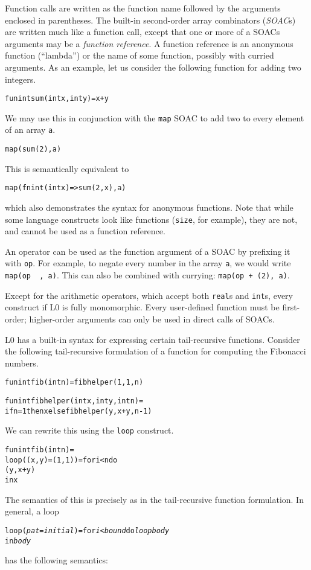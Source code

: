 \documentclass[oneside]{memoir}
\newcommand\realt[0]{\texttt{real}}
\newcommand\intt[0]{\texttt{int}}
\begin{document}
Function calls are written as the function name followed by the
arguments enclosed in parentheses.  The built-in second-order array
combinators (\emph{SOAC}s) are written much like a function call,
except that one or more of a SOACs arguments may be a \emph{function
  reference}.  A function reference is an anonymous function
(``lambda'') or the name of some function, possibly with curried
arguments.  As an example, let us consider the following function for
adding two integers.
\begin{alltt}
fun int sum(int x, int y) = x + y
\end{alltt}
We may use this in conjunction with the \texttt{map} SOAC to add two
to every element of an array \texttt{a}.
\begin{alltt}
map(sum (2), a)
\end{alltt}
This is semantically equivalent to
\begin{alltt}
map(fn int (int x) => sum(2, x), a)
\end{alltt}
which also demonstrates the syntax for anonymous functions.  Note that
while some language constructs look like functions (\texttt{size}, for
example), they are not, and cannot be used as a function reference.

An operator can be used as the function argument of a SOAC by
prefixing it with \texttt{op}.  For example, to negate every number in
the array \texttt{a}, we would write \texttt{map(op ~, a)}.  This can
also be combined with currying: \texttt{map(op + (2), a)}.

Except for the arithmetic operators, which accept both \realt{}s
and \intt{}s, every construct if L0 is fully monomorphic.  Every
user-defined function must be first-order; higher-order arguments can
only be used in direct calls of SOACs.

L0 has a built-in syntax for expressing certain tail-recursive
functions.  Consider the following tail-recursive formulation of a
function for computing the Fibonacci numbers.
\begin{alltt}
  fun int fib(int n) = fibhelper(1,1,n)

  fun int fibhelper(int x, int y, int n) =
    if n = 1 then x else fibhelper(y, x+y, n-1)
\end{alltt}
We can rewrite this using the \texttt{loop} construct.
\begin{alltt}
  fun int fib(int n) =
    loop ((x, y) = (1,1)) = for i < n do
                              (y, x+y)
    in x
\end{alltt}
The semantics of this is precisely as in the tail-recursive function
formulation.  In general, a loop
\begin{alltt}
  loop (\emph{pat} = \emph{initial}) = for \emph{i} < \emph{bound} do \emph{loopbody}
  in \emph{body}
\end{alltt}
has the following semantics:
\end{document}
